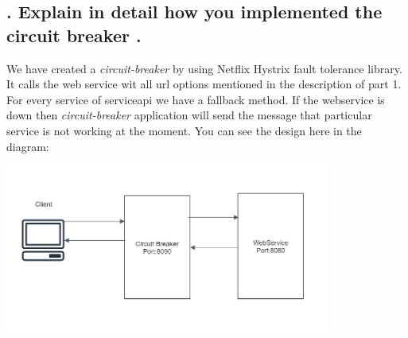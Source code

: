 
\subsection{. Explain in detail how you implemented the circuit
breaker
.}

We have created a \textit{circuit-breaker} by using Netflix Hystrix fault tolerance library. It calls the web service wit all url options mentioned in the description of part 1. For every service of serviceapi we have a fallback method. If the webservice is down then \textit{circuit-breaker} application will send the message that particular service is not working at the moment. You can see the design here in the diagram:

\includegraphics[keepaspectratio,width=0.8\textwidth,angle=0]{images/Circuit.PNG}
